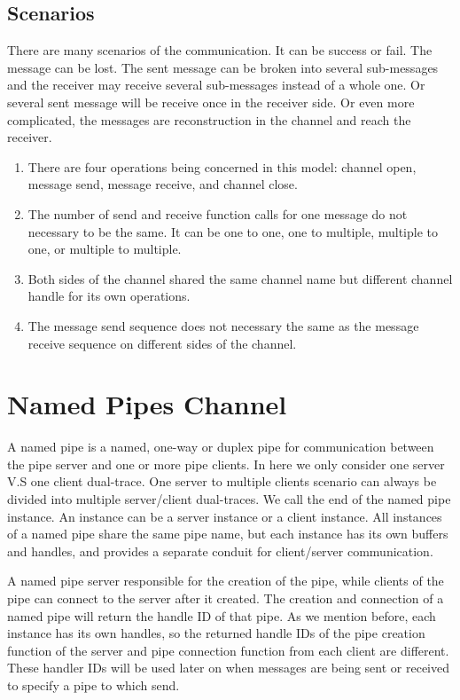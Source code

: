 \subsection{Scenarios}
There are many scenarios of the communication. It can be success or fail. The message can be lost. The sent message can be broken into several sub-messages and the receiver may receive several sub-messages instead of a whole one. Or several sent message will be receive once in the receiver side. Or even more complicated, the messages are reconstruction in the channel and reach the receiver. 
\begin{enumerate} 
\item There are four operations being concerned in this model: channel open, message send, message receive, and channel close. \item The number of send and receive function calls for one message do not necessary to be the same. It can be one to one, one to multiple, multiple to one, or multiple to multiple.
\item Both sides of the channel shared the same channel name but different channel handle for its own operations.
\item The message send sequence does not necessary the same as the message receive sequence on different sides of the channel.
\end{enumerate} 
\section{Named Pipes Channel}
A named pipe is a named, one-way or duplex pipe for communication between the pipe server and one or more pipe clients. In here we only consider one server V.S one client dual-trace. One server to multiple clients scenario can always be divided into multiple server/client dual-traces. We call the end of the named pipe instance. An instance can be a server instance or a client instance. All instances of a named pipe share the same pipe name, but each instance has its own buffers and handles, and provides a separate conduit for client/server communication. 

A named pipe server responsible for the creation of the pipe, while clients of the pipe can connect to the server after it created. The creation and connection of a named pipe will return the handle ID of that pipe. As we mention before, each instance has its own handles, so the returned handle IDs of the pipe creation function of the server and pipe connection function from each client are different. These handler IDs will be used later on when messages are being sent or received to specify a pipe to which send.



